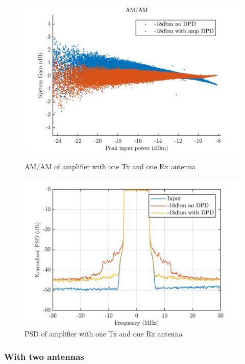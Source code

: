 \begin{figure}[H]
  \centering
  \begin{minipage}[b]{0.5\textwidth}
	\includegraphics[scale = 0.5]{figures/measurement/cree/amam_one_ant.png}
	\caption{AM/AM of amplifier with one Tx and one Rx antenna}
    \label{fig:cree_amam_one_ant}
  \end{minipage}
  \hfill
  \begin{minipage}[b]{0.4\textwidth}
\includegraphics[scale = 0.5]{figures/measurement/cree/psd_one_ant.png}
\caption{PSD of amplifier with one Tx and one Rx antenna}
    \label{fig:cree_psd_one_ant}
  \end{minipage}
\end{figure}
\subsubsection{With two antennas}

